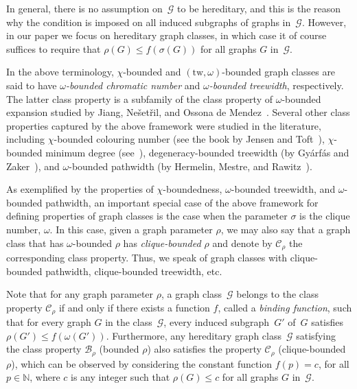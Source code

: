 \documentclass[11pt]{article}
\newcommand{\tw}{\mathrm{tw}}
\theoremstyle{plain}
\theoremstyle{definition}
\theoremstyle{remark}
\numberwithin{equation}{section}
\begin{document}
In general, there is no assumption on~$\mathcal{G}$ to be hereditary, and this is the reason why the condition is imposed on all induced subgraphs of graphs in~$\mathcal{G}$. 
However, in our paper we focus on hereditary graph classes, in which case it of course suffices to require that $\rho(G)\le f(\sigma(G))$ for all graphs $G$ in~$\mathcal{G}$.

In the above terminology, $\chi$-bounded and $(\tw,\omega)$-bounded graph classes are said to have \emph{$\omega$-bounded chromatic number} and \emph{$\omega$-bounded treewidth}, respectively.
The latter class property is a subfamily of the class property of $\omega$-bounded expansion studied by Jiang, Ne\v{s}et\v{r}il, and Ossona de Mendez~\cite{MR4513822}.
Several other class properties captured by the above framework were studied in the literature, including $\chi$-bounded colouring number (see the book by Jensen and Toft~\cite{MR1304254}), $\chi$-bounded minimum degree (see~\cite{MR2811077}), degeneracy-bounded treewidth (by Gy\'{a}rf\'{a}s and Zaker~\cite{MR3794363}), and $\omega$-bounded pathwidth (by Hermelin, Mestre, and Rawitz~\cite{MR3215457}).

\medskip
{} 
As exemplified by the properties of $\chi$-boundedness, $\omega$-bounded treewidth, and $\omega$-bounded pathwidth, an important special case of the above framework for defining properties of graph classes is the case when the parameter $\sigma$ is the clique number, $\omega$.
In this case, given a graph parameter $\rho$, we may also say that a graph class that has $\omega$-bounded $\rho$ has \emph{clique-bounded $\rho$} and denote by $\mathcal{C}_\rho$ the corresponding class property. 
Thus, we speak of graph classes with clique-bounded pathwidth, clique-bounded treewidth, etc.

Note that for any graph parameter $\rho$, a graph class~$\mathcal{G}$ belongs to the class property $\mathcal{C}_\rho$ if and only if there exists a function $f$, called a \emph{binding function}, such that for every graph $G$ in the class~$\mathcal{G}$, every induced subgraph~$G'$ of~$G$ satisfies $\rho(G')\le f(\omega(G'))$.
Furthermore, any hereditary graph class~$\mathcal{G}$ satisfying the class property $\mathcal{B}_\rho$ (bounded $\rho$) also satisfies the property $\mathcal{C}_\rho$ (clique-bounded $\rho$), which can be observed by considering the constant function $f(p) = c$, for all $p\in \mathbb{N}$, where $c$ is any integer such that $\rho(G)\le c$ for all graphs $G$ in~$\mathcal{G}$.
\end{document}
